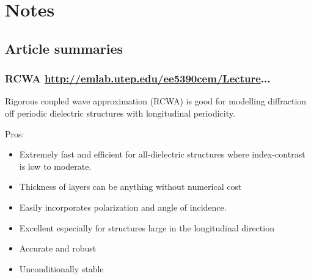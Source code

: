 
\chapter{Notes}

\section{Article summaries}
\subsection{RCWA \url{http://emlab.utep.edu/ee5390cem/Lecture}...}

Rigorous coupled wave approximation (RCWA) is good for modelling diffraction off periodic dielectric structures with longitudinal periodicity.


Pros:
\begin{itemize}
    \item Extremely fast and efficient for all-dielectric structures where index-contrast is low to moderate.
    
    \item Thickness of layers can be anything without numerical cost
    
    \item Easily incorporates polarization and angle of incidence.
    
    \item Excellent especially for structures large in the longitudinal direction
    
    \item Accurate and robust
    
    \item Unconditionally stable
\end{itemize}

